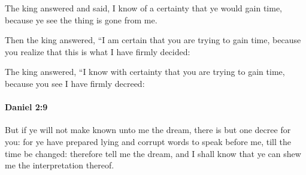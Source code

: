			\begin{versebox}
					\item[BHS] 
					\item[LXX] 
					\item[ASV] The king answered and said, I know of a certainty that ye would gain time, because ye see the thing is gone from me.
					\item[NIV] Then the king answered, “I am certain that you are trying to gain time, because you realize that this is what I have firmly decided:
					\item[NRSV] The king answered, “I know with certainty that you are trying to gain time, because you see I have firmly decreed:
			\end{versebox}

		\paragraph{Daniel 2:9} %
			\label{DANIEL-2-9}

			But if ye will not make known unto me the dream, there is but one decree for you: for ye have prepared lying and corrupt words to speak before me, till the time be changed: therefore tell me the dream, and I shall know that ye can shew me the interpretation thereof.

